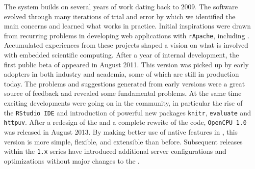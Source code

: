 
The \OpenCPU system builds on several years of work dating back to 2009. The software evolved through many iterations of trial and error by which we identified the main concerns and learned what works in practice. Initial inspirations were drawn from recurring problems in developing \R web applications with \texttt{rApache}, including \cite{van2009stage}. Accumulated experiences from these projects shaped a vision on what is involved with embedded scientific computing. After a year of internal development, the first public beta of \OpenCPU appeared in August 2011. This version was picked up by early adopters in both industry and academia, some of which are still in production today. The problems and suggestions generated from early versions were a great source of feedback and revealed some fundamental problems. At the same time exciting developments were going on in the \R community, in particular the rise of the \texttt{RStudio IDE} and introduction of powerful new \R packages \texttt{knitr}, \texttt{evaluate} and \texttt{httpuv}. After a redesign of the \API and a complete rewrite of the code, \texttt{OpenCPU 1.0} was released in August 2013. By making better use of native features in \HTTP, this version is more simple, flexible, and extensible than before. Subsequent releases within the \texttt{1.x} series have introduced additional server configurations and optimizations without major changes to the \API.




